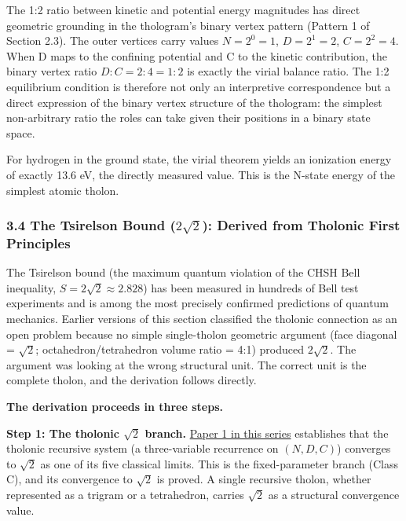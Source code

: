 \documentclass[12pt]{article}
\begin{document}
The 1:2 ratio between kinetic and potential energy magnitudes has direct
geometric grounding in the thologram's binary vertex pattern (Pattern 1
of Section 2.3). The outer vertices carry values \(N = 2^0 = 1\),
\(D = 2^1 = 2\), \(C = 2^2 = 4\). When D maps to the confining potential
and C to the kinetic contribution, the binary vertex ratio
\(D:C = 2:4 = 1:2\) is exactly the virial balance ratio. The 1:2
equilibrium condition is therefore not only an interpretive
correspondence but a direct expression of the binary vertex structure of
the thologram: the simplest non-arbitrary ratio the roles can take given
their positions in a binary state space.

For hydrogen in the ground state, the virial theorem yields an
ionization energy of exactly 13.6 eV, the directly measured value. This
is the N-state energy of the simplest atomic tholon.

\subsubsection{\texorpdfstring{3.4 The Tsirelson Bound (\(2\sqrt{2}\)):
Derived from Tholonic First
Principles}{3.4 The Tsirelson Bound (2\textbackslash sqrt\{2\}): Derived from Tholonic First Principles}}\label{the-tsirelson-bound-2sqrt2-derived-from-tholonic-first-principles}

The Tsirelson bound (the maximum quantum violation of the CHSH Bell
inequality, \(S = 2\sqrt{2} \approx 2.828\)) has been measured in
hundreds of Bell test experiments and is among the most precisely
confirmed predictions of quantum mechanics. Earlier versions of this
section classified the tholonic connection as an open problem because no
simple single-tholon geometric argument (face diagonal = \(\sqrt{2}\);
octahedron/tetrahedron volume ratio = 4:1) produced \(2\sqrt{2}\). The
argument was looking at the wrong structural unit. The correct unit is
the complete tholon, and the derivation follows directly.

\textbf{The derivation proceeds in three steps.}

\textbf{Step 1: The tholonic \(\sqrt{2}\) branch.}
\href{https://github.com/baardev/truevalue/blob/main/docnav/Research/papers/1_recursive-tholonic-five-constants/1_recursive-tholonic-five-constants.pdf}{Paper
1 in this series} establishes that the tholonic recursive system (a
three-variable recurrence on \((N, D, C)\)) converges to \(\sqrt{2}\) as
one of its five classical limits. This is the fixed-parameter branch
(Class C), and its convergence to \(\sqrt{2}\) is proved. A single
recursive tholon, whether represented as a trigram or a tetrahedron,
carries \(\sqrt{2}\) as a structural convergence value.
\end{document}
